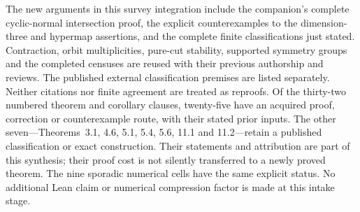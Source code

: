 \documentclass[11pt]{article}
\begin{document}
The new arguments in this survey integration include the companion's
complete cyclic-normal intersection proof, the explicit counterexamples
to the dimension-three and hypermap assertions, and the complete finite
classifications just stated.
Contraction, orbit multiplicities, pure-cut stability, supported
symmetry groups and the completed censuses are reused with their
previous authorship and reviews. The published external classification
premises are listed separately. Neither citations nor finite
agreement are treated as reproofs. Of the thirty-two numbered theorem and corollary clauses, twenty-five
have an acquired proof, correction or counterexample route, with their
stated prior inputs. The other seven---Theorems~3.1, 4.6, 5.1, 5.4, 5.6,
11.1 and 11.2---retain a published classification or exact construction.
Their statements and attribution are part of this synthesis; their proof
cost is not silently transferred to a newly proved theorem. The nine
sporadic numerical cells have the same explicit status. No additional
Lean claim or numerical compression factor is made at this intake stage.
\end{document}

